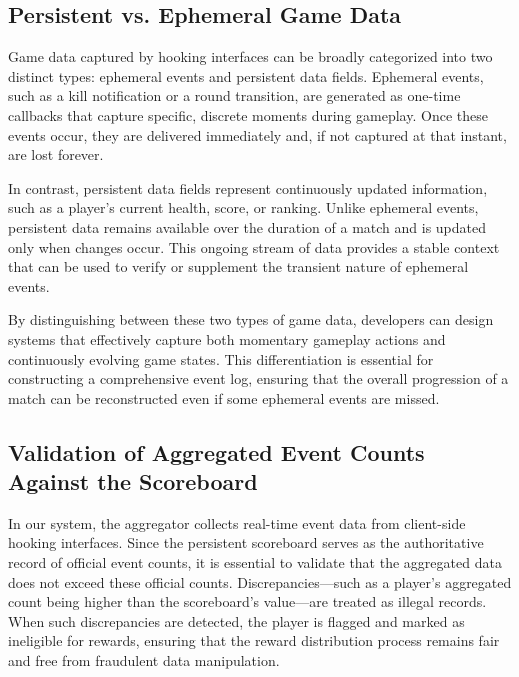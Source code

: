 \documentclass[11pt]{article}
\begin{document}
\subsection{Persistent vs. Ephemeral Game Data}

Game data captured by hooking interfaces can be broadly categorized into two distinct types: ephemeral events and persistent data fields. Ephemeral events, such as a kill notification or a round transition, are generated as one-time callbacks that capture specific, discrete moments during gameplay. Once these events occur, they are delivered immediately and, if not captured at that instant, are lost forever.

In contrast, persistent data fields represent continuously updated information, such as a player's current health, score, or ranking. Unlike ephemeral events, persistent data remains available over the duration of a match and is updated only when changes occur. This ongoing stream of data provides a stable context that can be used to verify or supplement the transient nature of ephemeral events.

By distinguishing between these two types of game data, developers can design systems that effectively capture both momentary gameplay actions and continuously evolving game states. This differentiation is essential for constructing a comprehensive event log, ensuring that the overall progression of a match can be reconstructed even if some ephemeral events are missed.

\subsection{Validation of Aggregated Event Counts Against the Scoreboard}

In our system, the aggregator collects real-time event data from client-side hooking interfaces. Since the persistent scoreboard serves as the authoritative record of official event counts, it is essential to validate that the aggregated data does not exceed these official counts. Discrepancies—such as a player's aggregated count being higher than the scoreboard's value—are treated as illegal records. When such discrepancies are detected, the player is flagged and marked as ineligible for rewards, ensuring that the reward distribution process remains fair and free from fraudulent data manipulation.
\end{document}
